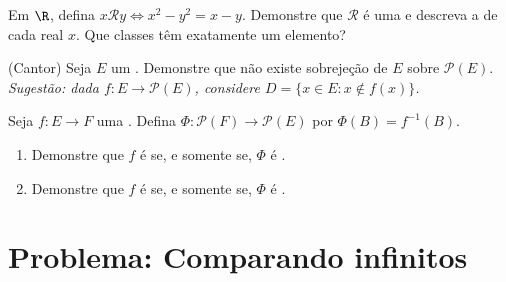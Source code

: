 \begin{exercise}[$\star\star$]\label{exo:b1:logic:10}
Em $\R$, defina $x \mathbin{\mathcal{R}} y \iff x^2 - y^2 = x - y$.
Demonstre que $\mathcal{R}$ é uma  e descreva a
 de cada real $x$. Que classes têm exatamente um
elemento?
\end{exercise}

\begin{exercise}[$\star\star\star$]\label{exo:b1:logic:11}
(Cantor) Seja $E$ um . Demonstre que não existe sobrejeção de $E$
sobre $\mathcal{P}(E)$. \emph{Sugestão: dada $f \colon E \to
\mathcal{P}(E)$, considere $D = \{x \in E : x \notin f(x)\}$.}
\end{exercise}

\begin{exercise}[$\star\star\star$]\label{exo:b1:logic:12}
Seja $f \colon E \to F$ uma . Defina $\Phi \colon \mathcal{P}(F)
\to \mathcal{P}(E)$ por $\Phi(B) = f^{-1}(B)$.
\begin{enumerate}
  \item Demonstre que $f$ é  se, e somente se, $\Phi$ é
        .
  \item Demonstre que $f$ é  se, e somente se, $\Phi$ é
        .
\end{enumerate}
\end{exercise}

\section{Problema: Comparando infinitos}

